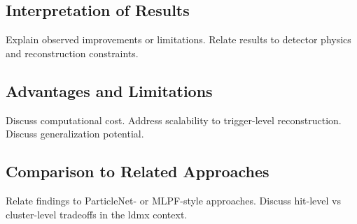 
\subsection{Interpretation of Results}
Explain observed improvements or limitations.
Relate results to detector physics and reconstruction constraints.

\subsection{Advantages and Limitations}
Discuss computational cost.
Address scalability to trigger-level reconstruction.
Discuss generalization potential.

\subsection{Comparison to Related Approaches}
Relate findings to ParticleNet- or MLPF-style approaches.
Discuss hit-level vs cluster-level tradeoffs in the \gls{ldmx} context.